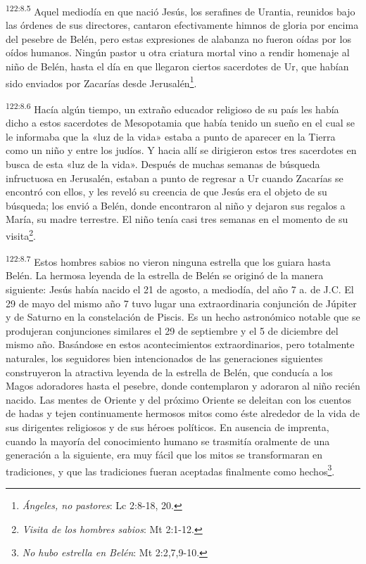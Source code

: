 \par 
\textsuperscript{122:8.5} Aquel mediodía en que nació Jesús, los serafines de Urantia, reunidos bajo las órdenes de sus directores, cantaron efectivamente himnos de gloria por encima del pesebre de Belén, pero estas expresiones de alabanza no fueron oídas por los oídos humanos. Ningún pastor u otra criatura mortal vino a rendir homenaje al niño de Belén, hasta el día en que llegaron ciertos sacerdotes de Ur, que habían sido enviados por Zacarías desde Jerusalén\footnote{\textit{Ángeles, no pastores}: Lc 2:8-18, 20.}.

\par 
\textsuperscript{122:8.6} Hacía algún tiempo, un extraño educador religioso de su país les había dicho a estos sacerdotes de Mesopotamia que había tenido un sueño en el cual se le informaba que la «luz de la vida» estaba a punto de aparecer en la Tierra como un niño y entre los judíos. Y hacia allí se dirigieron estos tres sacerdotes en busca de esta «luz de la vida». Después de muchas semanas de búsqueda infructuosa en Jerusalén, estaban a punto de regresar a Ur cuando Zacarías se encontró con ellos, y les reveló su creencia de que Jesús era el objeto de su búsqueda; los envió a Belén, donde encontraron al niño y dejaron sus regalos a María, su madre terrestre. El niño tenía casi tres semanas en el momento de su visita\footnote{\textit{Visita de los hombres sabios}: Mt 2:1-12.}.

\par 
\textsuperscript{122:8.7} Estos hombres sabios no vieron ninguna estrella que los guiara hasta Belén. La hermosa leyenda de la estrella de Belén se originó de la manera siguiente: Jesús había nacido el 21 de agosto, a mediodía, del año 7 a. de J.C. El 29 de mayo del mismo año 7 tuvo lugar una extraordinaria conjunción de Júpiter y de Saturno en la constelación de Piscis. Es un hecho astronómico notable que se produjeran conjunciones similares el 29 de septiembre y el 5 de diciembre del mismo año. Basándose en estos acontecimientos extraordinarios, pero totalmente naturales, los seguidores bien intencionados de las generaciones siguientes construyeron la atractiva leyenda de la estrella de Belén, que conducía a los Magos adoradores hasta el pesebre, donde contemplaron y adoraron al niño recién nacido. Las mentes de Oriente y del próximo Oriente se deleitan con los cuentos de hadas y tejen continuamente hermosos mitos como éste alrededor de la vida de sus dirigentes religiosos y de sus héroes políticos. En ausencia de imprenta, cuando la mayoría del conocimiento humano se trasmitía oralmente de una generación a la siguiente, era muy fácil que los mitos se transformaran en tradiciones, y que las tradiciones fueran aceptadas finalmente como hechos\footnote{\textit{No hubo estrella en Belén}: Mt 2:2,7,9-10.}.

